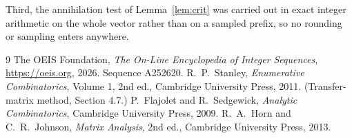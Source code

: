 \documentclass[11pt,a4paper]{article}
\theoremstyle{plain}
\theoremstyle{definition}
\begin{document}
Third, the annihilation test of Lemma~\ref{lem:crit} was carried out in exact integer
arithmetic on the whole vector rather than on a sampled prefix, so no rounding or sampling
enters anywhere.

\begin{thebibliography}{9}
 The OEIS Foundation, \emph{The On-Line Encyclopedia of Integer
Sequences}, \url{https://oeis.org}, 2026. Sequence A252620.
 R.~P.~Stanley, \emph{Enumerative Combinatorics}, Volume 1, 2nd ed.,
Cambridge University Press, 2011. (Transfer-matrix method, Section 4.7.)
 P.~Flajolet and R.~Sedgewick, \emph{Analytic Combinatorics}, Cambridge
University Press, 2009.
 R.~A.~Horn and C.~R.~Johnson, \emph{Matrix Analysis}, 2nd ed., Cambridge
University Press, 2013.
\end{thebibliography}
\end{document}
